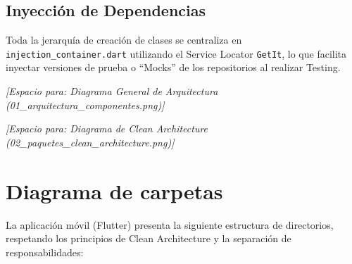 \documentclass{article}
\begin{document}
\subsection{Inyección de Dependencias}
Toda la jerarquía de creación de clases se centraliza en \texttt{injection\_container.dart} utilizando el Service Locator \texttt{GetIt}, lo que facilita inyectar versiones de prueba o ``Mocks'' de los repositorios al realizar Testing.

\vspace{0.5cm}
\begin{center}
    \textit{[Espacio para: Diagrama General de Arquitectura (01\_arquitectura\_componentes.png)]}
\end{center}

\vspace{0.5cm}
\begin{center}
    \textit{[Espacio para: Diagrama de Clean Architecture (02\_paquetes\_clean\_architecture.png)]}
\end{center}

\section{Diagrama de carpetas}
La aplicación móvil (Flutter) presenta la siguiente estructura de directorios, respetando los principios de Clean Architecture y la separación de responsabilidades:
\end{document}
